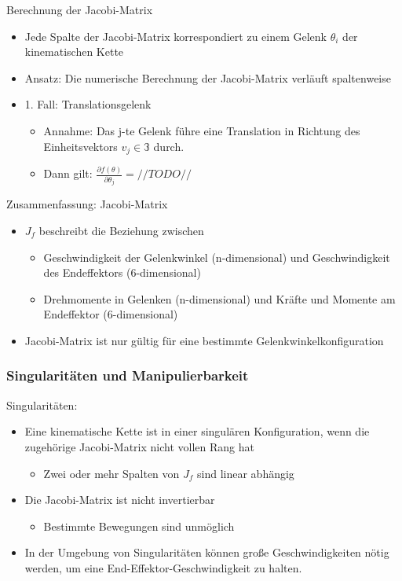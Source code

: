 \documentclass[paper=a4, fontsize=11pt]{scrartcl} %
\numberwithin{equation}{section} %
\numberwithin{figure}{section} %
\numberwithin{table}{section} %
\begin{document}
Berechnung der Jacobi-Matrix
\begin{itemize}
\item Jede Spalte der Jacobi-Matrix korrespondiert zu einem Gelenk $\theta_i$ der kinematischen Kette
\item Ansatz: Die numerische Berechnung der Jacobi-Matrix verläuft spaltenweise
\item 1. Fall: Translationsgelenk
\begin{itemize}
\item Annahme: Das j-te Gelenk führe eine Translation in Richtung des Einheitsvektors $v_j \in \mathbb{3}$ durch.
\item Dann gilt: $\frac{\partial f(\theta)}{\partial \theta_j} = //TODO//$
\end{itemize}
\end{itemize}

Zusammenfassung: Jacobi-Matrix
\begin{itemize}
\item $J_f$ beschreibt die Beziehung zwischen
\begin{itemize}
\item Geschwindigkeit der Gelenkwinkel (n-dimensional) und Geschwindigkeit des Endeffektors (6-dimensional)
\item Drehmomente in Gelenken (n-dimensional) und Kräfte und Momente am Endeffektor (6-dimensional)
\end{itemize}
\item Jacobi-Matrix ist nur gültig für eine bestimmte Gelenkwinkelkonfiguration
\end{itemize}


\subsubsection{Singularitäten und Manipulierbarkeit}

Singularitäten:
\begin{itemize}
\item Eine kinematische Kette ist in einer singulären Konfiguration, wenn die zugehörige Jacobi-Matrix nicht vollen Rang hat
\begin{itemize}
\item Zwei oder mehr Spalten von $J_f$ sind linear abhängig
\end{itemize}
\item Die Jacobi-Matrix ist nicht invertierbar
\begin{itemize}
\item Bestimmte Bewegungen sind unmöglich
\end{itemize}
\item In der Umgebung von Singularitäten können große Geschwindigkeiten nötig werden, um eine End-Effektor-Geschwindigkeit zu halten.
\end{itemize}
\end{document}
